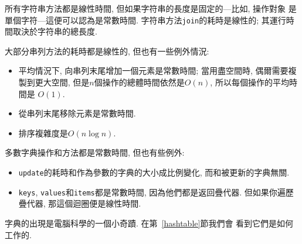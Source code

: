 \documentclass[10pt]{book}
\begin{document}
所有字符串方法都是線性時間, 但如果字符串的長度是固定的---比如, 操作對象
是單個字符---這便可以認為是常數時間.
字符串方法{\tt join}的耗時是線性的; 其運行時間取決於字符串的總長度. 

大部分串列方法的耗時都是線性的, 但也有一些例外情況:

\begin{itemize}

\item 平均情況下, 向串列末尾增加一個元素是常數時間;
當用盡空間時, 偶爾需要複製到更大空間, 
但是$n$個操作的總體時間依然是$O(n)$, 所以每個操作的平均時間是
$O(1)$. 

\item 從串列末尾移除元素是常數時間.

\item 排序複雜度是$O(n \log n)$.

\end{itemize}

多數字典操作和方法都是常數時間, 但也有些例外:

\begin{itemize}

\item {\tt update}的耗時和作為參數的字典的大小成比例變化, 而和被更新的字典無關. 

\item {\tt keys}, {\tt values}和{\tt items}都是常數時間, 因為他們都是返回疊代器. 
但如果你遍歷疊代器, 那這個迴圈便是線性時間. 

\end{itemize}

字典的出現是電腦科學的一個小奇蹟. 在第~\ref{hashtable}節我們會
看到它們是如何工作的. 
\end{document}
